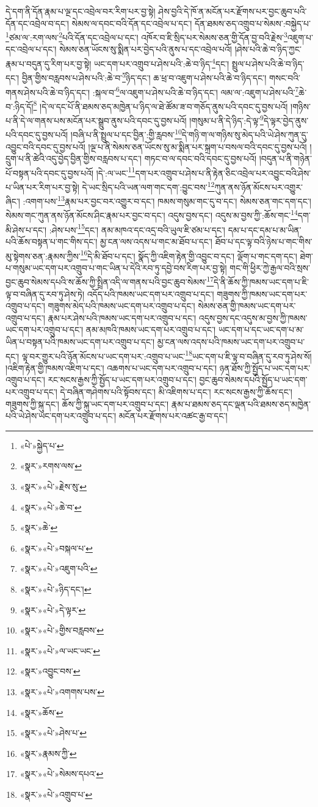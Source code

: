 དེ་དག་ནི་དོན་རྣམ་པ་ལྔ་དང་འབྲེལ་བར་རིག་པར་བྱ་སྟེ། ཤེས་བྱའི་དེ་ཁོ་ན་མངོན་པར་རྫོགས་པར་བྱང་ཆུབ་པའི་དོན་དང་འབྲེལ་བ་དང་། སེམས་ལ་དབང་བའི་དོན་དང་འབྲེལ་པ་དང་། དོན་ཐམས་ཅད་འགྲུབ་པ་སེམས་:བསྐྱེད་པ་\footnote{«པེ་»སྐྱེད་པ་}ཙམ་ལ་:རག་ལས་\footnote{«སྣར་»རགས་ལས་}པའི་དོན་དང་འབྲེལ་པ་དང་། འཁོར་བ་ཇི་སྲིད་པར་སེམས་ཅན་གྱི་དོན་བྱ་བའི་རྗེས་\footnote{«སྣར་»«པེ་»རྗེས་སུ་}འཇུག་པ་དང་འབྲེལ་པ་དང་། སེམས་ཅན་ཡོངས་སུ་སྨིན་པར་བྱེད་པའི་ནུས་པ་དང་འབྲེལ་པའོ། །ཤེས་པའི་ཆེ་བ་ཉིད་ཀྱང་རྣམ་པ་བདུན་དུ་རིག་པར་བྱ་སྟེ། ཡང་དག་པར་འགྲུབ་པ་ཤེས་པའི་:ཆེ་བ་ཉིད་\footnote{«སྣར་»«པེ་»ཆེ་བ་}དང་། སྤྲུལ་པ་ཤེས་པའི་ཆེ་བ་ཉིད་དང་། བྱིན་གྱིས་བརླབས་པ་ཤེས་པའི་:ཆེ་བ་\footnote{«སྣར་»ཆེ་}ཉིད་དང་། ཆ་ཕྲ་བ་འཇུག་པ་ཤེས་པའི་ཆེ་བ་ཉིད་དང་། གསང་བའི་གནས་ཤེས་པའི་ཆེ་བ་ཉིད་དང་། :སྐལ་བ་\footnote{«སྣར་»«པེ་»བསྐལ་པ་}ལ་འཇུག་པ་ཤེས་པའི་ཆེ་བ་ཉིད་དང་། ལམ་ལ་:འཇུག་པ་ཤེས་པའི་\footnote{«སྣར་»«པེ་»འཇུག་པའི་}ཆེ་བ་:ཉིད་དོ།\footnote{«སྣར་»«པེ་»ཉིད་དང་།} །དེ་ལ་དང་པོ་ནི་ཐམས་ཅད་མཁྱེན་པ་ཉིད་ལ་ཐེ་ཚོམ་ཟ་བ་གཅོད་ནུས་པའི་དབང་དུ་བྱས་པའོ། །གཉིས་པ་ནི་དེ་ལ་གནས་པས་མངོན་པར་སྒྲུབ་ནུས་པའི་དབང་དུ་བྱས་པའོ། །གསུམ་པ་ནི་དེ་ཉིད་:དེ་ལྟ་\footnote{«སྣར་»«པེ་»དེ་ལྟར་}དེ་ལྟར་བྱེད་ནུས་པའི་དབང་དུ་བྱས་པའོ། །བཞི་པ་ནི་སྤྲུལ་པ་དང་བྱིན་:གྱི་རླབས་\footnote{«སྣར་»«པེ་»གྱིས་བརླབས་}དེ་གཉི་ག་ལ་གཉིས་སུ་མེད་པའི་ཡེ་ཤེས་ཀུན་དུ་འབྱུང་བའི་དབང་དུ་བྱས་པའོ། །ལྔ་པ་ནི་སེམས་ཅན་ཡོངས་སུ་མ་སྨིན་པར་སྐྲག་པ་བསལ་བའི་དབང་དུ་བྱས་པའོ། །དྲུག་པ་ནི་ཚེའི་འདུ་བྱེད་བྱིན་གྱིས་བརླབས་པ་དང་། གཏང་བ་ལ་དབང་བའི་དབང་དུ་བྱས་པའོ། །བདུན་པ་ནི་གཉེན་པོ་བསྟན་པའི་དབང་དུ་བྱས་པའོ། །དེ་:ལ་ཡང་\footnote{«སྣར་»«པེ་»ལ་ཡང་ཡང་}དག་པར་འགྲུབ་པ་ཤེས་པ་ནི་རྟེན་ཅིང་འབྲེལ་པར་འབྱུང་བའི་ཤེས་པ་ཡིན་པར་རིག་པར་བྱ་སྟེ། དེ་ཡང་སྲིད་པའི་ཡན་ལག་གང་དག་:བྱུང་བས་\footnote{«སྣར་»འབྱུང་བས་}ཀུན་ནས་ཉོན་མོངས་པར་འགྱུར་ཞིང་། :འགག་པས་\footnote{«སྣར་»«པེ་»འགགས་པས་}རྣམ་པར་བྱང་བར་འགྱུར་བ་དང་། ཁམས་གསུམ་གང་དུ་བ་དང་། སེམས་ཅན་གང་དག་དང་། སེམས་གང་ཀུན་ནས་ཉོན་མོངས་ཤིང་རྣམ་པར་བྱང་བ་དང་། འདུས་བྱས་དང་། འདུས་མ་བྱས་ཀྱི་:ཆོས་གང་\footnote{«སྣར་»ཆོས་}དག་མི་ཤེས་པ་དང་། :ཤེས་པས་\footnote{«སྣར་»«པེ་»ཤེས་པ་}དང་། ནམ་མཁའ་དང་འདྲ་བའི་ཡུལ་ཇི་ཙམ་པ་དང་། དམ་པ་དང་དམ་པ་མ་ཡིན་པའི་ཆོས་བསྟན་པ་གང་གིས་དང་། མྱ་ངན་ལས་འདས་པ་གང་མ་ཐོབ་པ་དང་། ཐོབ་པ་དང་ལྟ་བའི་ཉེས་པ་གང་གིས་མུ་སྟེགས་ཅན་:རྣམས་ཀྱིས་\footnote{«སྣར་»རྣམས་ཀྱི་}དེ་མི་ཐོབ་པ་དང་། སྣོད་ཀྱི་འཇིག་རྟེན་གྱི་འབྱུང་བ་དང་། ལྡོག་པ་གང་དག་དང་། ཐེག་པ་གསུམ་ཡང་དག་པར་འགྲུབ་པ་གང་ཡིན་པ་དེའི་རབ་ཏུ་དབྱེ་བས་རིག་པར་བྱ་སྟེ། གང་གི་ཕྱིར་ཀྱེ་རྒྱལ་བའི་སྲས་བྱང་ཆུབ་སེམས་དཔའི་ས་ཆོས་ཀྱི་སྤྲིན་འདི་ལ་གནས་པའི་བྱང་ཆུབ་སེམས་\footnote{«སྣར་»«པེ་»སེམས་དཔའ་}དེ་ནི་ཆོས་ཀྱི་ཁམས་ཡང་དག་པ་ཇི་ལྟ་བ་བཞིན་དུ་རབ་ཏུ་ཤེས་ཏེ། འདོད་པའི་ཁམས་ཡང་དག་པར་འགྲུབ་པ་དང་། གཟུགས་ཀྱི་ཁམས་ཡང་དག་པར་འགྲུབ་པ་དང་། གཟུགས་མེད་པའི་ཁམས་ཡང་དག་པར་འགྲུབ་པ་དང་། སེམས་ཅན་གྱི་ཁམས་ཡང་དག་པར་འགྲུབ་པ་དང་། རྣམ་པར་ཤེས་པའི་ཁམས་ཡང་དག་པར་འགྲུབ་པ་དང་། འདུས་བྱས་དང་འདུས་མ་བྱས་ཀྱི་ཁམས་ཡང་དག་པར་འགྲུབ་པ་དང་། ནམ་མཁའི་ཁམས་ཡང་དག་པར་འགྲུབ་པ་དང་། ཡང་དག་པ་དང་ཡང་དག་པ་མ་ཡིན་པ་བསྟན་པའི་ཁམས་ཡང་དག་པར་འགྲུབ་པ་དང་། མྱ་ངན་ལས་འདས་པའི་ཁམས་ཡང་དག་པར་འགྲུབ་པ་དང་། ལྟ་བར་གྱུར་པའི་ཉོན་མོངས་པ་ཡང་དག་པར་:འགྲུབ་པ་ཡང་\footnote{«སྣར་»«པེ་»འགྲུབ་པ་}ཡང་དག་པ་ཇི་ལྟ་བ་བཞིན་དུ་རབ་ཏུ་ཤེས་སོ། །འཇིག་རྟེན་གྱི་ཁམས་འཇིག་པ་དང་། འཆགས་པ་ཡང་དག་པར་འགྲུབ་པ་དང་། ཉན་ཐོས་ཀྱི་སྤྱོད་པ་ཡང་དག་པར་འགྲུབ་པ་དང་། རང་སངས་རྒྱས་ཀྱི་སྤྱོད་པ་ཡང་དག་པར་འགྲུབ་པ་དང་། བྱང་ཆུབ་སེམས་དཔའི་སྤྱོད་པ་ཡང་དག་པར་འགྲུབ་པ་དང་། དེ་བཞིན་གཤེགས་པའི་སྟོབས་དང་། མི་འཇིགས་པ་དང་། རང་སངས་རྒྱས་ཀྱི་ཆོས་དང་། གཟུགས་ཀྱི་སྐུ་དང་། ཆོས་ཀྱི་སྐུ་ཡང་དག་པར་འགྲུབ་པ་དང་། རྣམ་པ་ཐམས་ཅད་དང་ལྡན་པའི་ཐམས་ཅད་མཁྱེན་པའི་ཡེ་ཤེས་ཡང་དག་པར་འགྲུབ་པ་དང་། མངོན་པར་རྫོགས་པར་འཚང་རྒྱ་བ་དང་། 